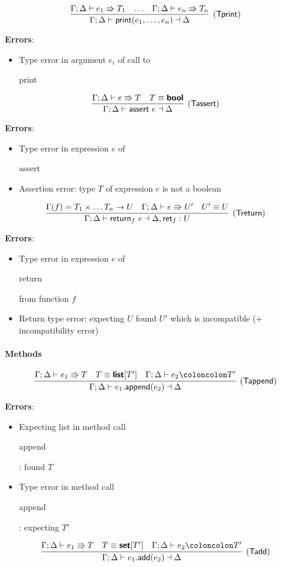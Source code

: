 \documentclass[a4paper]{article}
\newcommand{\kw}[1]{\textsf{\textbf{#1}}}
\newcommand{\code}[1]{\begin{sffamily}#1\end{sffamily}}
\newcommand{\mcode}[1]{\mathsf{#1}}
\newcommand{\colcol}{\coloncolon}
\newcommand{\yield}{\Rrightarrow}
\newcommand{\fun}[1]{\mathsf{#1}}
\begin{document}
$$
\infer[(\fun{Tprint})]{\Gamma ; \Delta \vdash \mcode{print}(e_1,\ldots,e_n) \dashv \Delta}
{\Gamma;\Delta \vdash e_1 \yield T_1 & \ldots &  \Gamma;\Delta \vdash e_n \yield T_n}
$$

\textbf{Errors}:
\begin{itemize}
\item Type error in argument $e_i$ of call to \code{print}
\end{itemize}

$$
\infer[(\fun{Tassert})]{\Gamma ; \Delta \vdash \mcode{assert}~e \dashv \Delta}
{\Gamma;\Delta \vdash e \yield T & T \equiv \kw{bool}}
$$

\textbf{Errors}:
\begin{itemize}
\item Type error in expression $e$ of \code{assert}
\item Assertion error: type $T$ of expression $e$ is not a boolean
\end{itemize}

$$
\infer[(\fun{Treturn})]{\Gamma ; \Delta \vdash \mcode{return}_f~e \dashv \Delta,\fun{ret}_f:U}
{\Gamma(f)=T_1 \times \ldots T_n \rightarrow U & \Gamma;\Delta \vdash e \yield U' & U' \equiv U}
$$

\textbf{Errors}:
\begin{itemize}
\item Type error in expression $e$ of \code{return} from function $f$
\item Return type error: expecting $U$ found $U'$ which is incompatible (+ incompatibility error)
\end{itemize}

\paragraph{Methods}


$$
\infer[(\fun{Tappend})]{\Gamma;\Delta \vdash e_1\mcode{.append}(e_2) \dashv \Delta}
{\Gamma;\Delta \vdash e_1 \yield T & T \equiv \kw{list}\mcode{[}T'\mcode{]} & \Gamma;\Delta \vdash e_2 \colcol T'} 
$$

\textbf{Errors}:
\begin{itemize}
\item Expecting list in method call \code{append}: found $T$
\item Type error in method call \code{append}: expecting $T'$
\end{itemize}

$$
\infer[(\fun{Tadd})]{\Gamma;\Delta \vdash e_1\mcode{.add}(e_2) \dashv \Delta}
{\Gamma;\Delta \vdash e_1 \yield T & T \equiv \kw{set}\mcode{[}T'\mcode{]} & \Gamma;\Delta \vdash e_2 \colcol T'} 
$$
\end{document}

